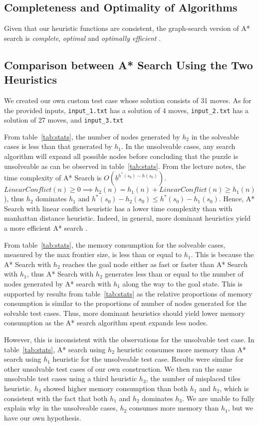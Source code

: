 \documentclass[10pt, a4paper]{article}
\theoremstyle{definition}
\begin{document}
\subsection{Completeness and Optimality of Algorithms}
Given that our heuristic functions are consistent, the graph-search version of A* search is \emph{complete}, \emph{optimal} and \emph{optimally efficient} \cite{russell_norvig_davis_2010}.

\subsection{Comparison between A* Search Using the Two Heuristics}
We created our own custom test case whose solution consists of 31 moves. As for the provided inputs, \texttt{input\_1.txt} has a solution of 4 moves, \texttt{input\_2.txt} has a solution of 27 moves, and \texttt{input\_3.txt}

From table~\ref{tab:stats}, the number of nodes generated by $h_2$ in the solveable cases is less than that generated by $h_1$.
In the unsolveable cases, any search algorithm will expand all possible nodes before concluding that the puzzle is unsolveable as can be observed in table~\ref{tab:stats}.
From the lecture notes, the time complexity of A* Search is $O(b^{h^*(s_0)-h(s_0)})$. $LinearConflict(n) \geq 0 \implies h_2(n) = h_1(n) + LinearConflict(n) \geq h_1(n)$), thus $h_2$ dominates $h_1$ and $h^*(s_0)-h_2(s_0) \leq h^*(s_0)-h_1(s_0)$.
Hence, A* Search with linear conflict heuristic has a lower time complexity than with manhattan distance heuristic.
Indeed, in general, more dominant heuristics yield a more efficient A* search \cite[p.~104]{russell_norvig_davis_2010}.


From table~\ref{tab:stats}, the memory consumption for the solveable cases, measured by the max frontier size, is less than or equal to $h_1$.
This is because the A* Search with $h_2$ reaches the goal node either as fast or faster than A* Search with $h_1$, thus A* Search with $h_2$ generates less than or equal to the number of nodes generated by A* search with $h_1$ along the way to the goal state.
This is supported by results from table~\ref{tab:stats} as the relative proportions of memory consumption is similar to the proportions of number of nodes generated for the solvable test cases.
Thus, more dominant heuristics should yield lower memory consumption as the A* search algorithm spent expands less nodes.

However, this is inconsistent with the observations for the unsolvable test case.
In table~\ref{tab:stats}, A* search using $h_2$ heuristic consumes more memory than A* search using $h_1$ heuristic for the unsolveable test case.
Results were similar for other unsolvable test cases of our own construction.
We then ran the same unsolvable test cases using a third heuristic $h_3$, the number of misplaced tiles heuristic.
$h_3$ showed higher memory consumption than both $h_1$ and $h_2$, which is consistent with the fact that both $h_1$ and $h_2$ dominates $h_3$.
We are unable to fully explain why in the unsolveable cases, $h_2$ consumes more memory than $h_1$, but we have our own hypothesis.
\end{document}
